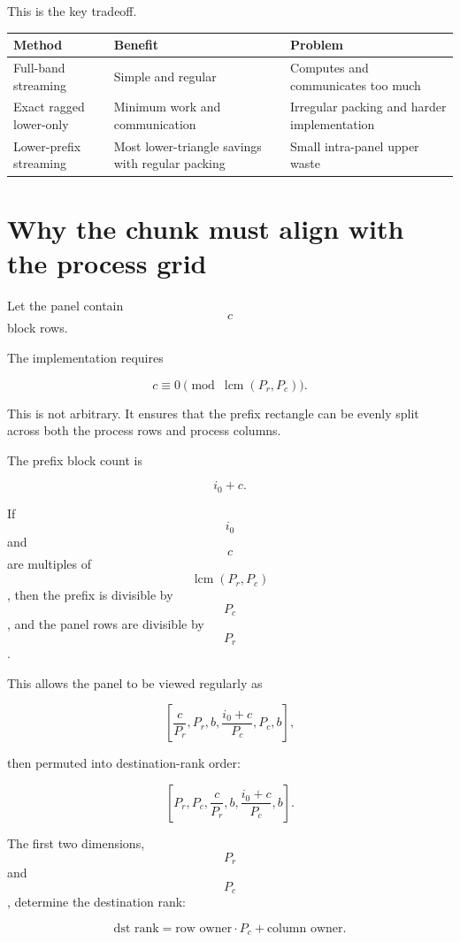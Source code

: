 \documentclass[11pt]{article}
\begin{document}
This is the key tradeoff.

\begin{center}
\begin{tabular}{>{\raggedright\arraybackslash}p{}
                >{\raggedright\arraybackslash}p{}
                >{\raggedright\arraybackslash}p{}}
\toprule
Method & Benefit & Problem \\
\midrule
Full-band streaming
& Simple and regular
& Computes and communicates too much \\
\midrule
Exact ragged lower-only
& Minimum work and communication
& Irregular packing and harder implementation \\
\midrule
Lower-prefix streaming
& Most lower-triangle savings with regular packing
& Small intra-panel upper waste \\
\bottomrule
\end{tabular}
\end{center}

\section{Why the chunk must align with the process grid}

Let the panel contain $$c$$ block rows.

The implementation requires

$$
c \equiv 0 \pmod{\operatorname{lcm}(P_r,P_c)}.
$$

This is not arbitrary. It ensures that the prefix rectangle can be evenly split across both the process rows and process columns.

The prefix block count is

$$
i_0 + c.
$$

If $$i_0$$ and $$c$$ are multiples of $$\operatorname{lcm}(P_r,P_c)$$, then the prefix is divisible by $$P_c$$, and the panel rows are divisible by $$P_r$$.

This allows the panel to be viewed regularly as

$$
\left[
\frac{c}{P_r},
P_r,
b,
\frac{i_0+c}{P_c},
P_c,
b
\right],
$$

then permuted into destination-rank order:

$$
\left[
P_r,
P_c,
\frac{c}{P_r},
b,
\frac{i_0+c}{P_c},
b
\right].
$$

The first two dimensions, $$P_r$$ and $$P_c$$, determine the destination rank:

$$
\text{dst rank}
=
\text{row owner} \cdot P_c
+
\text{column owner}.
$$
\end{document}
